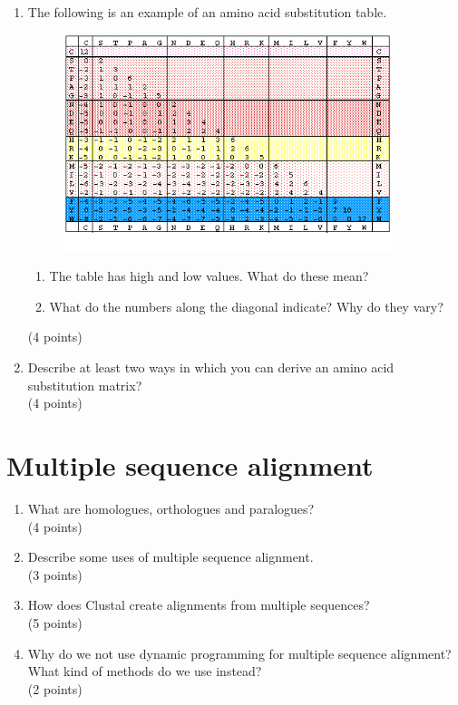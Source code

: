 \documentclass[11pt]{article}
\begin{document}
\begin{enumerate}
\begin{enumerate}
  \item What kind of alignment(s) did you obtain?
  \end{enumerate}
  (4 points)
\item The following is an example of an amino acid substitution table.
  \begin{figure}[H]
    \includegraphics[width=0.9\textwidth]{images/dayhoff_256}
  \end{figure}
  \begin{enumerate}
  \item The table has high and low values. What do these mean?
  \item What do the numbers along the diagonal indicate? Why do they
    vary?
  \end{enumerate}
  (4 points)
\item Describe at least two ways in which you can derive an amino acid
  substitution matrix?\\
  (4 points)
\end{enumerate}

\section{Multiple sequence alignment}
\begin{enumerate}
\item What are homologues, orthologues and paralogues?\\
  (4 points)
\item Describe some uses of multiple sequence alignment.\\
  (3 points)
\item How does Clustal create alignments from multiple
  sequences?\\
  (5 points)
\item Why do we not use dynamic programming for multiple
  sequence alignment? What kind of methods do we use
  instead?\\
  (2 points)
\end{enumerate}
\end{document}
